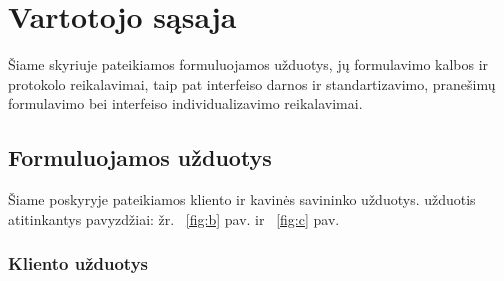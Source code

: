 \documentclass{VUMIFPSkursinis}
\begin{document}

\section{Vartotojo sąsaja}
Šiame skyriuje pateikiamos formuluojamos užduotys, jų formulavimo kalbos ir protokolo reikalavimai, taip pat interfeiso darnos ir standartizavimo, pranešimų formulavimo bei interfeiso individualizavimo reikalavimai.
 
\subsection{Formuluojamos užduotys}
Šiame poskyryje pateikiamos kliento ir kavinės savininko užduotys. užduotis atitinkantys pavyzdžiai: žr. ~\ref{fig:b} pav. ir ~\ref{fig:c} pav.
\subsubsection{Kliento užduotys}
\end{document}
